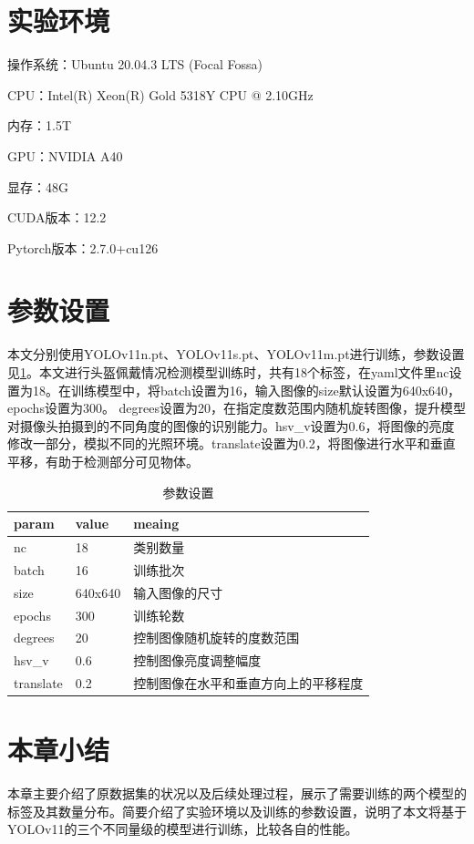 \section{实验环境}
操作系统：Ubuntu 20.04.3 LTS (Focal Fossa)

CPU：Intel(R) Xeon(R) Gold 5318Y CPU @ 2.10GHz

内存：1.5T

GPU：NVIDIA A40

显存：48G

CUDA版本：12.2

Pytorch版本：2.7.0+cu126

\section{参数设置}
本文分别使用YOLOv11n.pt、YOLOv11s.pt、YOLOv11m.pt进行训练，参数设置见\ref{tab:param}。本文进行头盔佩戴情况检测模型训练时，共有18个标签，在yaml文件里nc设置为18。在训练模型中，将batch设置为16，输入图像的size默认设置为640x640，epochs设置为300。
degrees设置为20，在指定度数范围内随机旋转图像，提升模型对摄像头拍摄到的不同角度的图像的识别能力。hsv\_v设置为0.6，将图像的亮度修改一部分，模拟不同的光照环境。translate设置为0.2，将图像进行水平和垂直平移，有助于检测部分可见物体。

\begin{table}[htb]
    \centering
    \caption[标签解释]{参数设置\label{tab:param}}
    \begin{tabular}{lll}
        \toprule
        \multicolumn{1}{l}{param} & \multicolumn{1}{l}{value} & \multicolumn{1}{l}{meaing}\\
        \midrule
        nc & 18 & 类别数量\\
        batch & 16 & 训练批次\\
        size & 640x640 & 输入图像的尺寸\\
        epochs & 300 & 训练轮数\\
        degrees & 20 & 控制图像随机旋转的度数范围\\
        hsv\_v & 0.6 & 控制图像亮度调整幅度\\
        translate & 0.2 & 控制图像在水平和垂直方向上的平移程度\\
        \bottomrule
    \end{tabular}
\end{table}


\section{本章小结}
本章主要介绍了原数据集的状况以及后续处理过程，展示了需要训练的两个模型的标签及其数量分布。简要介绍了实验环境以及训练的参数设置，说明了本文将基于YOLOv11的三个不同量级的模型进行训练，比较各自的性能。


